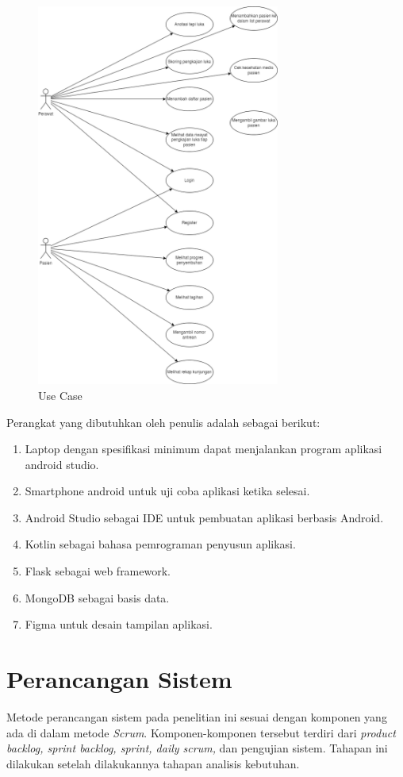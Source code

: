 \begin{figure}[H]
	\centering
	\includegraphics[keepaspectratio, width=8cm]{gambar/usecase}
	\caption{Use Case}
	\label{gambar:use_case}
\end{figure}

Perangkat yang dibutuhkan oleh penulis adalah sebagai berikut:
\begin{enumerate}
\item Laptop dengan spesifikasi minimum dapat menjalankan program aplikasi android studio.
\item Smartphone android untuk uji coba aplikasi ketika selesai.
\item Android Studio sebagai IDE untuk pembuatan aplikasi berbasis Android.
\item Kotlin sebagai bahasa pemrograman penyusun aplikasi.
\item Flask sebagai web framework.
\item MongoDB sebagai basis data.
\item Figma untuk desain tampilan aplikasi.
\end{enumerate}

\section{Perancangan Sistem}

Metode perancangan sistem pada penelitian ini sesuai dengan komponen yang ada di dalam metode \textit{Scrum}. Komponen-komponen tersebut terdiri dari \textit{product backlog, sprint backlog, sprint, daily scrum,} dan pengujian sistem. Tahapan ini dilakukan setelah dilakukannya tahapan analisis kebutuhan.

